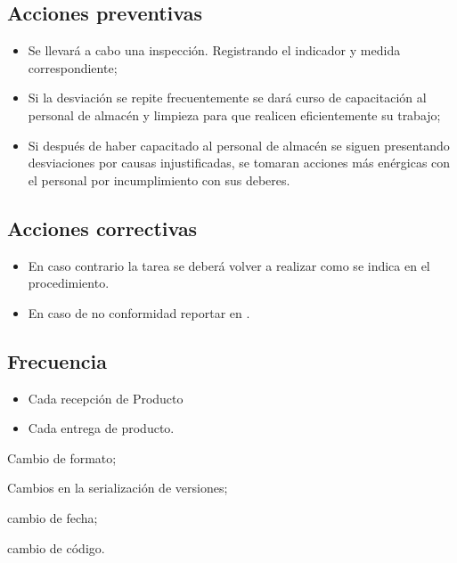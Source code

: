 \subsection{Acciones preventivas}

\begin{itemize}
	\item Se llevará a cabo una inspección. Registrando el indicador y medida correspondiente;
	\item Si la desviación se repite frecuentemente se dará curso de capacitación al personal de almacén y limpieza para que realicen eficientemente su trabajo;
	\item Si después de haber capacitado al personal de almacén se siguen presentando desviaciones por causas injustificadas, se tomaran acciones más enérgicas con el personal por incumplimiento con sus deberes.
\end{itemize}

\subsection{Acciones correctivas}

\begin{itemize}
	\item En caso contrario la tarea se deberá volver a realizar como se indica en el procedimiento.
	\item En caso de no conformidad reportar en \RAC.
\end{itemize}

\subsection{Frecuencia}

\begin{itemize}
	\item Cada recepción de Producto
	\item Cada entrega de producto.
\end{itemize}

\begin{changelog}[simple, sectioncmd=\subsection*,label=changelog-2.2]
	
	\begin{version}[v=2.1, date=2023--01, author=Pablo E. Alanis]
			\item Cambio de formato;
			\item Cambios en la serialización de versiones;
	\end{version}

	\begin{version}[v=1.3, date=2022--05, author=Alonso M.]
		\item cambio de fecha;
		\item cambio de código.
	\end{version}

\end{changelog}